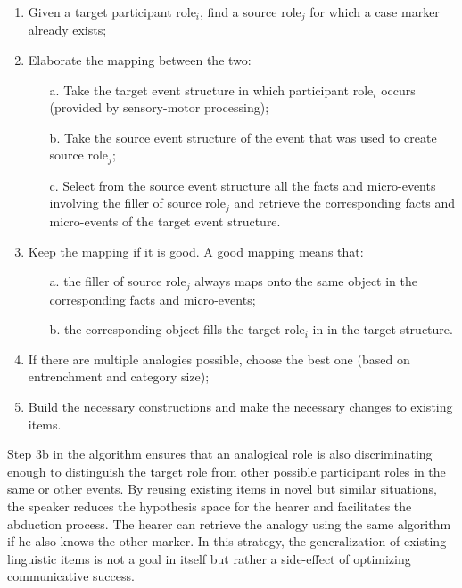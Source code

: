 \begin{enumerate}
\item Given a target participant role$_{i}$, find a source role$_{j}$ for which a case marker already exists;
\item Elaborate the mapping between the two:
\begin{enumerate}
\item[a.] Take the target event structure in which participant role$_{i}$ occurs (provided by sensory-motor processing);
\item[b.] Take the source event structure of the event that was used to create source role$_{j}$;
\item[c.] Select from the source event structure all the facts and micro-events involving the filler of source role$_{j}$ and retrieve the corresponding facts and micro-events of the target event structure. 
\end{enumerate}
\item Keep the mapping if it is good. A good mapping means that:
\begin{enumerate}
\item[a.] the filler of source role$_{j}$ always maps onto the same object in the corresponding facts and micro-events;
\item[b.] the corresponding object fills the target role$_{i}$ in in the target structure.
\end{enumerate}
\item If there are multiple analogies possible, choose the best one (based on entrenchment and category size);
\item Build the necessary constructions and make the necessary changes to existing items.
\end{enumerate}

Step 3b in the algorithm ensures that an analogical role is also discriminating enough to distinguish the target role from other possible participant roles in the same or other events. By reusing existing items in novel but similar situations, the speaker reduces the hypothesis space for the hearer and facilitates the abduction process. The hearer can retrieve the analogy using the same algorithm if he also knows the other marker. In this strategy, the generalization of existing linguistic items is not a goal in itself but rather a side-effect of optimizing communicative success.


